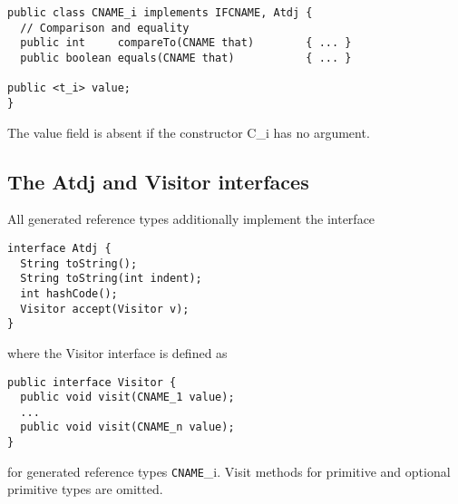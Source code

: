 \begin{verbatim}
public class CNAME_i implements IFCNAME, Atdj {
  // Comparison and equality
  public int     compareTo(CNAME that)        { ... }
  public boolean equals(CNAME that)           { ... }

public <t_i> value;
}
\end{verbatim}

The value field is absent if the constructor C\_i has no argument.

\subsection{The Atdj and Visitor interfaces}

All generated reference types additionally implement the interface

\begin{verbatim}
interface Atdj {
  String toString();
  String toString(int indent);
  int hashCode();
  Visitor accept(Visitor v);
}
\end{verbatim}

where the Visitor interface is defined as

\begin{verbatim}
public interface Visitor {
  public void visit(CNAME_1 value);
  ...
  public void visit(CNAME_n value);
}
\end{verbatim}

for generated reference types \texttt{CNAME}\_i.  Visit methods for primitive
and optional primitive types are omitted.
